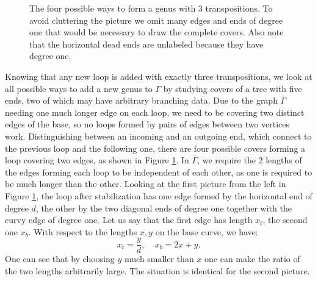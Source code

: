 \documentclass[11pt,reqno]{amsart}
\theoremstyle{definition}
\begin{document}
\begin{figure}[tb]
    \caption{The four possible ways to form a genus with 3 transpositions. To avoid cluttering the picture we omit many edges and ends of degree one that would be necessary to draw the complete covers. Also note that the horizontal dead ends are unlabeled because they have degree one.}
    \label{fig:addinggenus}
\end{figure}

Knowing that any new loop is added with exactly three transpositions, we look at all possible ways to add a new genus to $\Gamma$ by studying covers of a tree with five ends, two of which may have arbitrary branching data. Due to the graph $\overline{\Gamma}$ needing one much longer edge on each loop, we need to be covering two distinct edges of the base, so no  loops formed by pairs of edges between two vertices work. Distinguishing between an incoming and an outgoing end, which connect to the previous loop and the following one, there are four possible covers forming a loop covering two edges, as shown in Figure \ref{fig:addinggenus}. %
In $\overline{\Gamma}$, we require the 2 lengths of the edges forming each loop to be independent of each other, as one is required to be much longer than the other. Looking at the first picture from the left in Figure \ref{fig:addinggenus}, the loop after stabilization has one edge formed by the horizontal end of degree $d$, the other by the two diagonal ends of degree one together with the curvy edge of degree one. Let us say that the first edge has length $x_t$, the second one $x_b$. With respect to the lengths $x,y$ on the base curve, we have:
\[
x_t = \frac{y}{d}, \ \ \ \ \ 
x_b =  2x+y.
\]
One can see that by choosing $y$ much smaller than $x$ one can make the ratio of the two lengths arbitrarily large.
The situation is identical for the second picture. 
\end{document}
